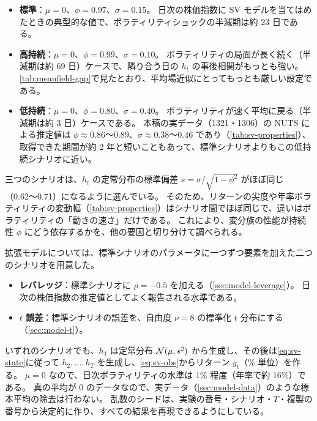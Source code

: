 \begin{itemize}
  \item \textbf{標準}：$\mu = 0$、$\phi = 0.97$、$\sigma = 0.15$。
    日次の株価指数に SV モデルを当てはめたときの典型的な値で、ボラティリティショックの半減期は約 23 日である。
  \item \textbf{高持続}：$\mu = 0$、$\phi = 0.99$、$\sigma = 0.10$。
    ボラティリティの局面が長く続く（半減期は約 69 日）ケースで、隣り合う日の $h_t$ の事後相関がもっとも強い。
    \cref{tab:meanfield-gap}で見たとおり、平均場近似にとってもっとも厳しい設定である。
  \item \textbf{低持続}：$\mu = 0$、$\phi = 0.80$、$\sigma = 0.40$。
    ボラティリティが速く平均に戻る（半減期は約 3 日）ケースである。
    本稿の実データ（1321・1306）の NUTS による推定値は $\phi \approx 0.86$〜$0.89$、$\sigma \approx 0.38$〜$0.46$ であり（\cref{tab:sv-properties}）、
    取得できた期間が約 2 年と短いこともあって、標準シナリオよりもこの低持続シナリオに近い。
\end{itemize}

三つのシナリオは、$h_t$ の定常分布の標準偏差 $s = \sigma / \sqrt{1 - \phi^2}$ がほぼ同じ（0.62〜0.71）になるように選んでいる。
そのため、リターンの尖度や年率ボラティリティの変動幅（\cref{tab:sv-properties}）はシナリオ間でほぼ同じで、違いはボラティリティの「動きの速さ」だけである。
これにより、変分族の性能が持続性 $\phi$ にどう依存するかを、他の要因と切り分けて調べられる。

拡張モデルについては、標準シナリオのパラメータに一つずつ要素を加えた二つのシナリオを用意した。

\begin{itemize}
  \item \textbf{レバレッジ}：標準シナリオに $\rho = -0.5$ を加える（\cref{sec:model-leverage}）。
    日次の株価指数の推定値としてよく報告される水準である。
  \item \textbf{$t$ 誤差}：標準シナリオの誤差を、自由度 $\nu = 8$ の標準化 $t$ 分布にする（\cref{sec:model-t}）。
\end{itemize}

いずれのシナリオでも、$h_1$ は定常分布 $\mathcal{N}(\mu, s^2)$ から生成し、その後は\cref{eq:sv-state}に従って $h_2, \dots, h_T$ を生成し、\cref{eq:sv-obs}からリターン $y_t$（\% 単位）を作る。
$\mu = 0$ なので、日次ボラティリティの水準は 1\% 程度（年率で約 16\%）である。
真の平均が 0 のデータなので、実データ（\cref{sec:model-data}）のような標本平均の除去は行わない。
乱数のシードは、実験の番号・シナリオ・$T$・複製の番号から決定的に作り、すべての結果を再現できるようにしている。

